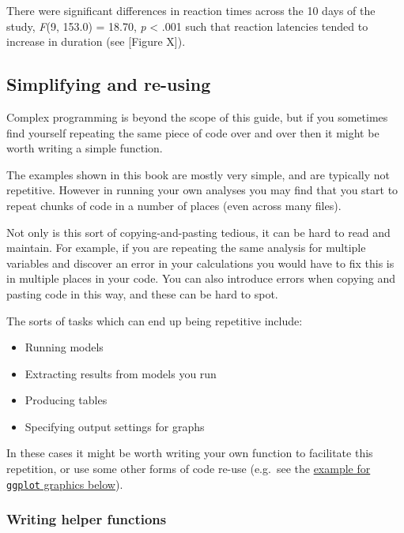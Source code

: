 \documentclass[]{article}
\providecommand{\tightlist}{%
  \setlength{\itemsep}{0pt}\setlength{\parskip}{0pt}}
\theoremstyle{definition}
\theoremstyle{definition}
\theoremstyle{definition}
\theoremstyle{remark}
\begin{document}
{There were significant differences in reaction times across the 10 days
of the study, \emph{F}(9, 153.0) = 18.70, \emph{p} \textless{} .001 such
that reaction latencies tended to increase in duration (see {[}Figure
X{]}).}

\subsection*{Simplifying and re-using}\label{code-reuse}

Complex programming is beyond the scope of this guide, but if you
sometimes find yourself repeating the same piece of code over and over
then it might be worth writing a simple function.

The examples shown in this book are mostly very simple, and are
typically not repetitive. However in running your own analyses you may
find that you start to repeat chunks of code in a number of places (even
across many files).

Not only is this sort of copying-and-pasting tedious, it can be hard to
read and maintain. For example, if you are repeating the same analysis
for multiple variables and discover an error in your calculations you
would have to fix this is in multiple places in your code. You can also
introduce errors when copying and pasting code in this way, and these
can be hard to spot.

The sorts of tasks which can end up being repetitive include:

\begin{itemize}
\tightlist
\item
  Running models
\item
  Extracting results from models you run
\item
  Producing tables
\item
  Specifying output settings for graphs
\end{itemize}

In these cases it might be worth writing your own function to facilitate
this repetition, or use some other forms of code re-use (e.g.~see the
\protect\hyperlink{ggplot-reuse}{example for \texttt{ggplot} graphics
below}).

\hypertarget{helper-functions}{\subsubsection*{Writing helper
functions}\label{helper-functions}}
\end{document}
